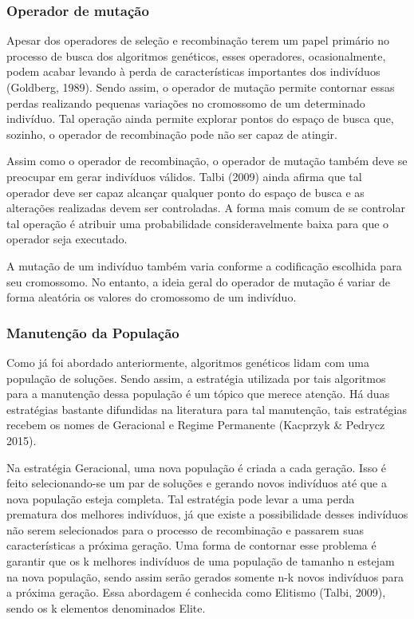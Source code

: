 \subsubsection{Operador de mutação}

Apesar dos operadores de seleção e recombinação terem um papel primário no processo de busca dos algoritmos genéticos, esses operadores, ocasionalmente, podem acabar levando à perda de características importantes dos indivíduos (Goldberg, 1989). Sendo assim, o operador de mutação permite contornar essas perdas realizando pequenas variações no cromossomo de um determinado indivíduo. Tal operação ainda permite explorar pontos do espaço de busca que, sozinho, o operador de recombinação pode não ser capaz de atingir.

Assim como o operador de recombinação, o operador de mutação também deve se preocupar em gerar indivíduos válidos. Talbi (2009) ainda afirma que tal operador deve ser capaz alcançar qualquer ponto do espaço de busca e as alterações realizadas devem ser controladas. A forma mais comum de se controlar tal operação é atribuir uma probabilidade consideravelmente baixa para que o operador seja executado.

A mutação de um indivíduo também varia conforme a codificação escolhida para seu cromossomo. No entanto, a ideia geral do operador de mutação é variar de forma aleatória os valores do cromossomo de um indivíduo. 

\subsubsection{Manutenção da População}

Como já foi abordado anteriormente, algoritmos genéticos lidam com uma população de soluções. Sendo assim, a estratégia utilizada por tais algoritmos para a manutenção dessa população é um tópico que merece atenção. Há duas estratégias bastante difundidas na literatura para tal manutenção, tais estratégias recebem os nomes de Geracional e Regime Permanente (Kacprzyk \& Pedrycz 2015).

Na estratégia Geracional, uma nova população é criada a cada geração. Isso é feito selecionando-se um par de soluções e gerando novos indivíduos até que a nova população esteja completa. Tal estratégia pode levar a uma perda prematura dos melhores indivíduos, já que existe a possibilidade desses indivíduos não serem selecionados para o processo de recombinação e passarem suas características a próxima geração. Uma forma de contornar esse problema é garantir que os k melhores indivíduos de uma população de tamanho n estejam na nova população, sendo assim serão gerados somente n-k novos indivíduos para a próxima geração. Essa abordagem é conhecida como Elitismo (Talbi, 2009), sendo os k elementos denominados Elite.

